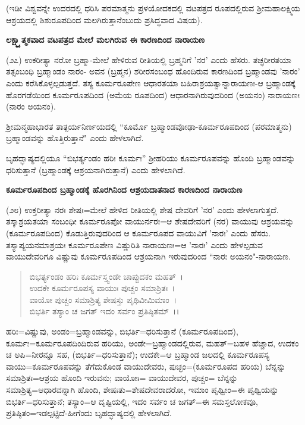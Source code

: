 (ಇಡೀ ವಿಶ್ವವನ್ನೇ ಉದರದಲ್ಲಿ ಧರಿಸಿ ಪರಮಾತ್ಮನು ಪ್ರಳಯೋದಕದಲ್ಲಿ ವಟಪತ್ರದ ರೂಪದಲ್ಲಿರುವ ಶ‍್ರೀಮಹಾಲಕ್ಷ್ಮಿಯ ಆಶ್ರಯದಲ್ಲಿ ಶಿಶುರೂಪದಿಂದ ಮಲಗಿರುತ್ತಾನೆಂಬುದು ಪ್ರಸಿದ್ಧವಾದ ವಿಷಯ).

\begin{center}
\textbf{ಲಕ್ಷ್ಮ್ಯಾತ್ಮಕವಾದ ವಟಪತ್ರದ ಮೇಲೆ ಮಲಗಿರುವ ಈ ಕಾರಣದಿಂದ ನಾರಾಯಣ}
\end{center}

(೨೭) ಉಕರೀತ್ಯಾ ನರೋ ಬ್ರಹ್ಮಾ-ಮೇಲೆ ಹೇಳಿರುವ ರೀತಿಯಲ್ಲಿ ಬ್ರಹ್ಮನಿಗೆ 'ನರ' ಎಂದು ಹೆಸರು. ತಚ್ಛರೀರತಯಾ ತತ್ಸಂಬಂಧಿ ಬ್ರಹ್ಮಾಂಡಂ ನಾರಂ- ಅವನ (ಬ್ರಹ್ಮನ) ಶರೀರಸಂಬಂಧ ಹೊಂದಿರುವ ಕಾರಣದಿಂದ ಬ್ರಹ್ಮಾಂಡವು 'ನಾರಂ' ಎಂದು ಕರೆಸಿಕೊಳ್ಳಲ್ಪಡುತ್ತದೆ. ತಸ್ಯ ಕೂರ್ಮರೂಪೇಣ ಆಧಾರತಯಾ ಬಹಿರಾಶ್ರಯತ್ವಾನ್ನಾರಾಯಣಃ-ಆ ಬ್ರಹ್ಮಾಂಡಕ್ಕೆ ಹೊರಗಡೆಯಿಂದ ಕೂರ್ಮರೂಪದಿಂದ (ಅಮೆಯ ರೂಪದಿಂದ) ಆಧಾರನಾಗಿರುವುದರಿಂದ (ಅಯನಂ) ನಾರಾಯಣಃ (ನಾರಂ ಅಯನಂ).

 ಶ‍್ರೀಮನ್ಮಹಾಭಾರತ ತಾತ್ಪರ್ಯನಿರ್ಣಯದಲ್ಲಿ ``ಕೂರ್ಮೊ ಬ್ರಹ್ಮಾಂಡವೋಢಾ-ಕೂರ್ಮರೂಪದಿಂದ (ಪರಮಾತ್ಮನು) ಬ್ರಹ್ಮಾಂಡವನ್ನು ಹೊತ್ತಿರುತ್ತಾನೆ" ಎಂದು ಹೇಳಲಾಗಿದೆ.

ಬೃಹದ್ಭಾಷ್ಯದಲ್ಲಿಯೂ ``ಬಿಭರ್ತ್ಯಂಡಂ ಹರಿಃ ಕೂರ್ಮಃ'' ಶ‍್ರೀಹರಿಯು ಕೂರ್ಮರೂಪವನ್ನು ಹೊಂದಿ ಬ್ರಹ್ಮಾಂಡವನ್ನು ಧರಿಸುತ್ತಾನೆ (ಬ್ರಹ್ಮಾಂಡಕ್ಕೆ ಆಶ್ರಯನಾಗಿರುತ್ತಾನೆ) ಎಂದು ಹೇಳಲಾಗಿದೆ.

\begin{center}
\textbf{ಕೂರ್ಮರೂಪದಿಂದ ಬ್ರಹ್ಮಾಂಡಕ್ಕೆ ಹೊರಗಿನಿಂದ ಆಶ್ರಯದಾತನಾದ ಕಾರಣದಿಂದ ನಾರಾಯಣ}
\end{center}

(೨೮) ಉಕ್ತರೀತ್ಯಾ ನರಃ ಶೇಷಃ=ಮೇಲೆ ಹೇಳಿದ ರೀತಿಯಲ್ಲಿ ಶೇಷ ದೇವರಿಗೆ 'ನರ' ಎಂದು ಹೇಳಲಾಗುತ್ತದೆ. ತಸ್ಕಾಶ್ರಯತಯಾ ಸಂಬಂಧೀ ಕೂರ್ಮರೂಪೋ ವಾಯುರ್ನರಃ=ಆ ಶೇಷದೇವರಿಗೆ (ನರ) ವಾಯುವು ಆಶ್ರಯವನ್ನು (ಕೂರ್ಮರೂಪದಿಂದ) ಕೊಡುತ್ತಿರುವುದರಿಂದ ಆ ಕೂರ್ಮರೂಪದ ವಾಯುವಿಗೆ 'ನಾರಃ' ಎಂದು ಹೆಸರು. ತಸ್ಯಾಪ್ಯಯನಮಾಶ್ರಯಃ ಕೂರ್ಮರೂಪೇಣ ವಿಷ್ಣುರಿತಿ ನಾರಾಯಣಃ=ಆ 'ನಾರಃ' ಎಂದು ಹೇಳಲ್ಪಡುವ ವಾಯುದೇವರಿಗೂ ವಿಷ್ಣುವು ಕೂರ್ಮರೂಪದಿಂದ ಆಶ್ರಯನಾಗಿ ಇರುವುದರಿಂದ ``ನಾರಃ ಅಯನಂ"-ನಾರಾಯಣ.

\begin{verse}
ಬಿಭರ್ತ್ಯಂಡಂ ಹರಿಃ ಕೂರ್ಮಸ್ತ್ವಂಡೇ ಚಾಪ್ಪುದಕಂ ಮಹತ್~।\\ ಉದಕೇ ಕೂರ್ಮರೂಪಸ್ಯ ವಾಯುಃ ಪುಚ್ಚಂ ಸಮಾಶ್ರಿತಃ~।\\ ವಾಯೋ ಪುಚ್ಚಂ ಸಮಾಶ್ರಿತ್ಯ ಶೇಷಸ್ತು ಪೃಥಿವೀಮಿಮಾಂ~।\\ ಬಿಭರ್ತಿ ತಸ್ಯಾಂ ಚ ಜಗತ್ ಇದಂ ಸರ್ವಂ ಪ್ರತಿಷ್ಠಿತಮ್~।।
\end{verse}

ಹರಿಃ=ವಿಷ್ಣುವು, ಅಂಡಂ=ಬ್ರಹ್ಮಾಂಡವನ್ನು, ಬಿಭರ್ತಿ=ಧರಿಸುತ್ತಾನೆ (ಕೂರ್ಮರೂಪದಿಂದ), ಕೂರ್ಮಃ=ಕೂರ್ಮರೂಪದಿಂದಿರುವ ಹರಿಯು, ಅಂಡೇ=ಬ್ರಹ್ಮಾಂಡದಲ್ಲಿರುವ, ಮಹತ್=ಬಹಳ ಹೆಚ್ಚಾದ, ಉದಕಂ ಚ ಅಪಿ=ನೀರನ್ನೂ ಸಹ, (ಬಿಭರ್ತಿ=ಧರಿಸುತ್ತಾನೆ); ಉದಕೇ=ಆ ಬ್ರಹ್ಮಾಂಡ ಜಲದಲ್ಲಿ ಕೂರ್ಮರೂಪಸ್ಯ ವಾಯು=ಕೂರ್ಮರೂಪವನ್ನು ತೆಗೆದುಕೊಂಡ ವಾಯುದೇವರು, ಪುಚ್ಛಂ=(ಕೂರ್ಮರೂಪದ ಹರಿಯ) ಬೆನ್ನನ್ನು ಸಮಾಶ್ರಿತಃ=ಆಶ್ರಯ ಹೊಂದಿ ಇರುವನು; ವಾಯೋಃ= ವಾಯುದೇವರ, ಪುಚ್ಚಂ= ಬೆನ್ನನ್ನು ಸಮಾಶ್ರಿತ್ಯ=ಆಧಾರವನ್ನಾಗಿ ಹೊಂದಿ, ಶೇಷಃತು=ಶೇಷದೇವರಾದರೋ, ಇಮಾಂ ಪೃಥ್ವೀಂ=ಈ ಪೃಥ್ವಿಯನ್ನು ಬಿಭರ್ತಿ=ಧರಿಸುತ್ತಾನೆ; ತಸ್ಯಾಂ=ಆ ದೃಷ್ಟಿಯಲ್ಲಿ, ಇದಂ ಸರ್ವಂ ಚ ಜಗತ್=ಈ ಸಮಸ್ತಲೋಕವೂ, ಪ್ರತಿಷ್ಠಿತಂ=ಇಡಲ್ಪಟ್ಟಿದೆ-ಹೀಗೆಂದು ಬೃಹದ್ಭಾಷ್ಯದಲ್ಲಿ ಹೇಳಲಾಗಿದೆ.


